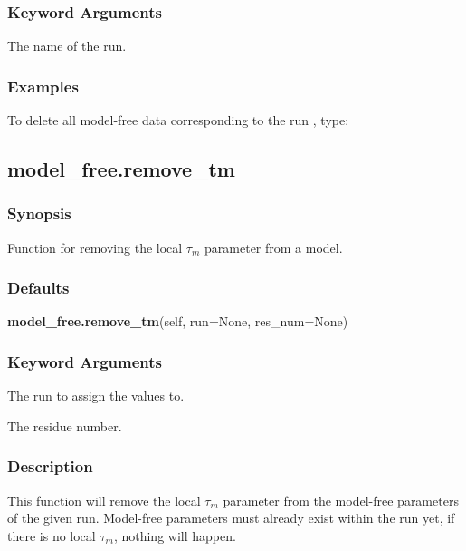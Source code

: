 \subsubsection{Keyword Arguments}


  The name of the run.

\subsubsection{Examples}

To delete  all model-free data corresponding to the run 
, type:




\newpage

\subsection{model\_free.remove\_tm}


\subsubsection{Synopsis}

Function for removing the local $\tau_m$ parameter from a model.

\subsubsection{Defaults}

\textsf{\textbf{model\_free.remove\_tm}(self, run=None, res\_num=None)}


\subsubsection{Keyword Arguments}


  The run to assign the values to.

  The residue number.

\subsubsection{Description}

This function will remove the local $\tau_m$ parameter from the model-free parameters of the given
run.  Model-free parameters must already exist within the run yet, if there is no local $\tau_m$,
nothing will happen.

